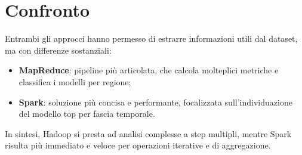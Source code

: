 	\section{Confronto}
		Entrambi gli approcci hanno permesso di estrarre informazioni utili dal dataset, ma con differenze sostanziali:
		
		\begin{itemize}
			\item \textbf{MapReduce}: pipeline più articolata, che calcola molteplici metriche e classifica i modelli per regione;
			\item \textbf{Spark}: soluzione più concisa e performante, focalizzata sull’individuazione del modello top per fascia temporale.
		\end{itemize}
		
		In sintesi, Hadoop si presta ad analisi complesse a step multipli, mentre Spark risulta più immediato e veloce per operazioni iterative e di aggregazione.